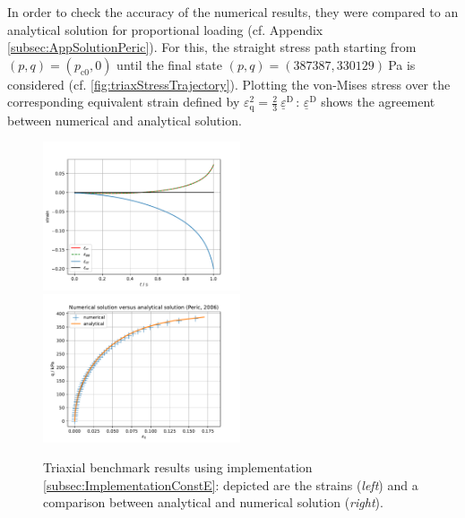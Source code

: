 \documentclass[paper=a4, twoside, pagesize]{scrartcl}
\newcommand{\tensor}[1]{\underline{#1}}
\newcommand{\ppkt}{\,\colon\,}
\newcommand{\D}{\text{D}}
\renewcommand{\c}{\text{c}}
\begin{document}
\par
In order to check the accuracy of the numerical results, they were compared to an analytical solution \cite{Peric2006} for proportional loading (cf. Appendix \ref{subsec:AppSolutionPeric}). For this, the straight stress path starting from $(p, q) = (p_{\c0}, 0)$ until the final state $(p, q)=(387387, 330129)\ $Pa is considered (cf. \autoref{fig:triaxStressTrajectory}). Plotting the von-Mises stress over the corresponding equivalent strain defined by $\varepsilon_{\text{q}}^2= {\tfrac{2}{3}\ \tensor\varepsilon^\D\ppkt\tensor\varepsilon^\D}$ shows the agreement between numerical and analytical solution.
\par
\begin{figure}[h!]
  \includegraphics[width=0.52\textwidth]{img/SemiExplicitModifiedCamClay_OpenGeoSys2023/ModCamClay_TriaxStudy_Strains_41.pdf}
  \includegraphics[width=0.52\textwidth]{img/SemiExplicitModifiedCamClay_OpenGeoSys2023/ModCamClay_TriaxStudy_NumVsAnal_41.pdf}
  \caption{Triaxial benchmark results using implementation \ref{subsec:ImplementationConstE}: depicted are the strains (\textsl{left}) and a comparison between analytical and numerical solution (\textsl{right}).}\label{fig:triaxStressStrains}
\end{figure}
\end{document}
